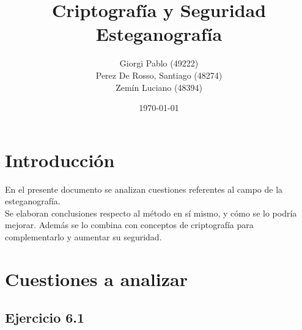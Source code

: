 \documentclass{article}
\begin{document}

\title{Criptografía y Seguridad\\ Esteganografía}
\author{Giorgi Pablo (49222) \\  Perez De Rosso, Santiago (48274) \\ Zemín Luciano (48394) 
}
\date{\today}
\maketitle

\tableofcontents

\section{Introducción}

\noindent En el presente documento se analizan cuestiones referentes al campo de la esteganografía. \\
Se elaboran conclusiones respecto al método en sí mismo, y cómo se lo podría mejorar. Además se lo combina con conceptos de criptografía para complementarlo y aumentar su seguridad. \\

\section{Cuestiones a analizar}

\subsection{Ejercicio 6.1}
\end{document}
